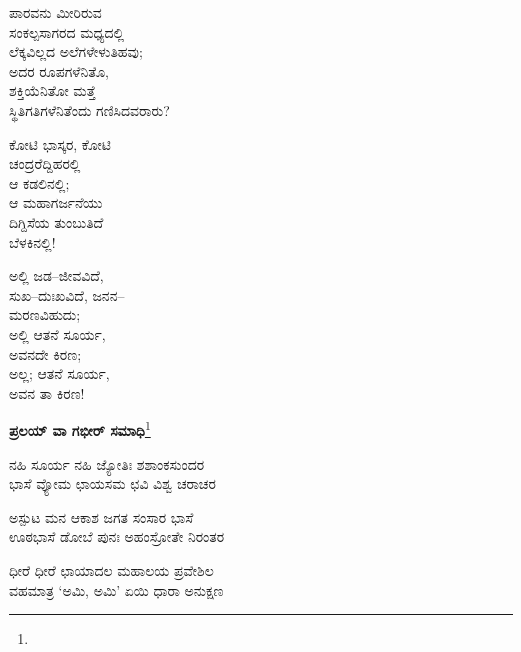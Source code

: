 \begin{myquote}
ಪಾರವನು ಮೀರಿರುವ\\ಸಂಕಲ್ಪಸಾಗರದ ಮಧ್ಯದಲ್ಲಿ\\ಲೆಕ್ಕವಿಲ್ಲದ ಅಲೆಗಳೇಳುತಿಹವು;\\ಅದರ ರೂಪಗಳೆನಿತೊ,\\ಶಕ್ತಿಯೆನಿತೋ ಮತ್ತೆ\\ಸ್ಥಿತಿಗತಿಗಳೆನಿತೆಂದು ಗಣಿಸಿದವರಾರು?
\end{myquote}

\begin{myquote}
ಕೋಟಿ ಭಾಸ್ಕರ, ಕೋಟಿ\\ಚಂದ್ರರೆದ್ದಿಹರಲ್ಲಿ\\ಆ ಕಡಲಿನಲ್ಲಿ;\\ಆ ಮಹಾಗರ್ಜನೆಯು\\ದಿಗ್ದಿಸೆಯ ತುಂಬುತಿದೆ\\ಬೆಳಕಿನಲ್ಲಿ!
\end{myquote}

\begin{myquote}
ಅಲ್ಲಿ ಜಡ–ಜೀವವಿದೆ,\\ಸುಖ–ದುಃಖವಿದೆ, ಜನನ–\\ಮರಣವಿಹುದು;\\ಅಲ್ಲಿ ಆತನೆ ಸೂರ್ಯ,\\ಅವನದೇ ಕಿರಣ;\\ಅಲ್ಲ; ಆತನೆ ಸೂರ್ಯ,\\ಅವನ ತಾ ಕಿರಣ!
\end{myquote}

\begin{center}
\textbf{ಪ್ರಲಯ್ ವಾ ಗಭೀರ್ ಸಮಾಧಿ}\footnote{}
\end{center}

\begin{myquote}
ನಹಿ ಸೂರ್ಯ ನಹಿ ಜ್ಯೋತಿಃ ಶಶಾಂಕಸುಂದರ\\ಭಾಸೆ ವ್ಯೋಮ ಛಾಯಸಮ ಛವಿ ವಿಶ್ವ ಚರಾಚರ
\end{myquote}


\begin{myquote}
ಅಸ್ಪುಟ ಮನ ಆಕಾಶ ಜಗತ ಸಂಸಾರ ಭಾಸೆ\\ಊಠಭಾಸೆ ಡೋಬೆ ಪುನಃ ಅಹಂಸ್ರೋತೇ ನಿರಂತರ
\end{myquote}


\begin{myquote}
ಧೀರೆ ಧೀರೆ ಛಾಯಾದಲ ಮಹಾಲಯ ಪ್ರವೇಶಿಲ\\ವಹಮಾತ್ರ ‘ಅಮಿ, ಅಮಿ’ ಏಯಿ ಧಾರಾ ಅನುಕ್ಷಣ
\end{myquote}


